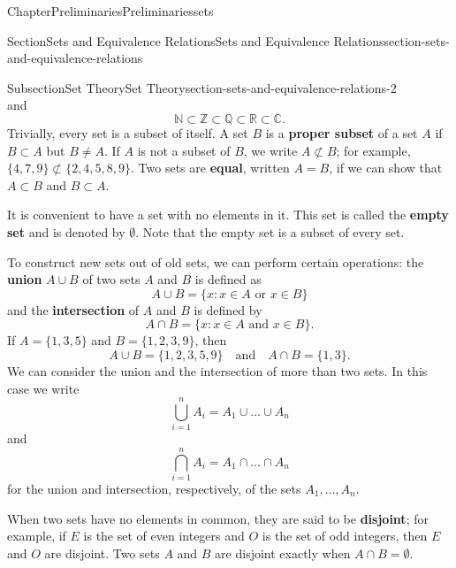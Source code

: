 \documentclass[oneside,10pt,]{book}
\newcommand{\terminology}[1]{\textbf{#1}}
\numberwithin{equation}{section}
\newcommand{\notsubset}{\not\subset}
\begin{document}
\begin{chapterptx}{Chapter}{Preliminaries}{}{Preliminaries}{}{}{sets}
\begin{sectionptx}{Section}{Sets and Equivalence Relations}{}{Sets and Equivalence Relations}{}{}{section-sets-and-equivalence-relations}
\begin{subsectionptx}{Subsection}{Set Theory}{}{Set Theory}{}{}{section-sets-and-equivalence-relations-2}
\begin{equation*}
\end{equation*}
and%
\begin{equation*}
{\mathbb N} \subset {\mathbb Z} \subset {\mathbb Q} \subset {\mathbb R} \subset {\mathbb C}\text{.}
\end{equation*}
Trivially, every set is a subset of itself.  A set \(B\) is a \terminology{proper subset} of a set \(A\) if \(B \subset A\) but \(B \neq A\). If \(A\) is not a subset of \(B\), we write \(A \notsubset B\); for example, \(\{4, 7, 9\} \notsubset \{2, 4, 5,  8, 9 \}\).  Two sets are \terminology{equal}, written \(A = B\), if we can show that \(A \subset B\) and \(B \subset A\).%
\par
It is convenient to have a set with no elements in it.  This set is called the \terminology{empty set} and is denoted by \(\emptyset\).  Note that the empty set is a subset of every set. \label{section-sets-and-equivalence-relations-2-6-3}%
\par
To construct new sets out of old sets, we can perform certain operations: the \terminology{union} \(A \cup B\) of two sets \(A\) and \(B\) is defined as%
\begin{equation*}
A \cup B = \{x : x \in A \text{ or } x \in B \}
\end{equation*}
and the \terminology{intersection} of \(A\) and \(B\)  is defined by%
\begin{equation*}
A \cap B = \{x :  x \in A \text{ and } x \in B \}\text{.}
\end{equation*}
\label{section-sets-and-equivalence-relations-2-7-10}\label{section-sets-and-equivalence-relations-2-7-11} If \(A = \{1, 3, 5\}\) and \(B = \{ 1, 2, 3, 9 \}\), then%
\begin{equation*}
A \cup B = \{1, 2, 3, 5, 9 \} \quad \text{and} \quad A \cap B = \{ 1, 3 \}\text{.}
\end{equation*}
We can consider the union and the intersection of more than two sets.  In this case we write%
\begin{equation*}
\bigcup_{i = 1}^{n} A_{i} = A_{1} \cup \ldots \cup A_n
\end{equation*}
and%
\begin{equation*}
\bigcap_{i = 1}^{n} A_{i} = A_{1} \cap \ldots \cap A_n
\end{equation*}
for the union and intersection, respectively, of the sets \(A_1, \ldots, A_n\).%
\par
When two sets have no elements in common, they are said to be \terminology{disjoint}; for example, if \(E\) is the set of even integers and \(O\) is the set of odd integers, then \(E\) and \(O\) are disjoint.  Two sets \(A\) and \(B\) are disjoint exactly when \(A \cap B = \emptyset\).%

\end{subsectionptx}
\end{sectionptx}
\end{chapterptx}
\end{document}
